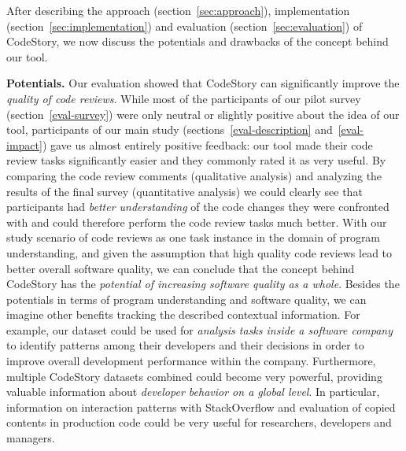 \documentclass[../manifest.tex]{subfiles}
\begin{document}
After describing the approach (section~\ref{sec:approach}), implementation (section~\ref{sec:implementation}) and evaluation (section~\ref{sec:evaluation}) of CodeStory, we now discuss the potentials and drawbacks of the concept behind our tool.

\textbf{Potentials.}
Our evaluation showed that CodeStory can significantly improve the \textit{quality of code reviews}. While most of the participants of our pilot survey (section~\ref{eval-survey}) were only neutral or slightly positive about the idea of our tool, participants of our main study (sections~\ref{eval-description} and~\ref{eval-impact}) gave us almost entirely positive feedback: our tool made their code review tasks significantly easier and they commonly rated it as very useful. By comparing the code review comments (qualitative analysis) and analyzing the results of the final survey (quantitative analysis) we could clearly see that participants had \textit{better understanding} of the code changes they were confronted with and could therefore perform the code review tasks much better. With our study scenario of code reviews as one task instance in the domain of program understanding, and given the assumption that high quality code reviews lead to better overall software quality, we can conclude that the concept behind CodeStory has the \textit{potential of increasing software quality as a whole}. Besides the potentials in terms of program understanding and software quality, we can imagine other benefits tracking the described contextual information. For example, our dataset could be used for \textit{analysis tasks inside a software company} to identify patterns among their developers and their decisions in order to improve overall development performance within the company. Furthermore, multiple CodeStory datasets combined could become very powerful, providing valuable information about \textit{developer behavior on a global level}. In particular, information on interaction patterns with StackOverflow and evaluation of copied contents in production code could be very useful for researchers, developers and managers.
\end{document}
